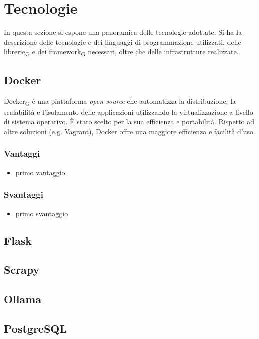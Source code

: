 \section{Tecnologie }
In questa sezione si espone una panoramica delle tecnologie adottate. Si ha la descrizione delle tecnologie e dei linguaggi di programmazione utilizzati, delle librerie\textsubscript{G} e dei framework\textsubscript{G} necessari, oltre che delle infrastrutture realizzate. 
\subsection{Docker}
Docker\textsubscript{G} è una piattaforma \textit{open-source} che automatizza la distribuzione, la scalabilità e l’isolamento delle applicazioni utilizzando la virtualizzazione a livello di sistema operativo. È stato scelto per la sua efficienza e portabilità. Rispetto ad altre soluzioni (e.g. Vagrant), Docker offre una maggiore efficienza e facilità d’uso.
\subsubsection{Vantaggi}
\begin{itemize}
    \item primo vantaggio
\end{itemize}
\subsubsection{Svantaggi}
\begin{itemize}
    \item primo svantaggio
\end{itemize}
\subsection{Flask}

\subsection{Scrapy}

\subsection{Ollama}

\subsection{PostgreSQL}

